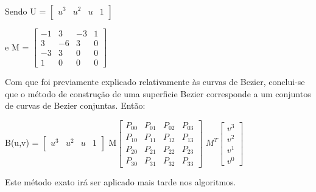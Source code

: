 Sendo U = $\begin{bmatrix}
       u^{3} & u^{2} & u & 1          \\[0.3em]
		\end{bmatrix}$

e M = $\begin{bmatrix}
		       -1 & 3 & -3  & 1           \\[0.3em]
		        3 & -6 &  3 & 0   \\[0.3em]
		       -3 & 3 & 0 & 0 \\[0.3em]
		       1 & 0 & 0 & 0
		     \end{bmatrix}$

Com que foi previamente explicado relativamente às curvas de Bezier, conclui-se que o método de construção de uma superficie Bezier corresponde a um conjuntos de curvas de Bezier conjuntas. 
Então:

B(u,v) = $\begin{bmatrix}
       u^{3} & u^{2} & u & 1          \\[0.3em]
		\end{bmatrix}$ 
		M$\begin{bmatrix}
		       P_{00} & P_{01} & P_{02} & P_{03}   \\[0.3em]
		       P_{10} & P_{11} & P_{12} & P_{13}   \\[0.3em]
		       P_{20} & P_{21} & P_{22} & P_{23}   \\[0.3em]
		       P_{30} & P_{31} & P_{32} & P_{33}
		     \end{bmatrix}$
		$M^{T} \begin{bmatrix}
		       v^{3}           \\[0.3em]
		       v^{2}   \\[0.3em]
		       v^{1} \\[0.3em]
		       v^{0}
		     \end{bmatrix}$

Este método exato irá ser aplicado mais tarde nos algoritmos.